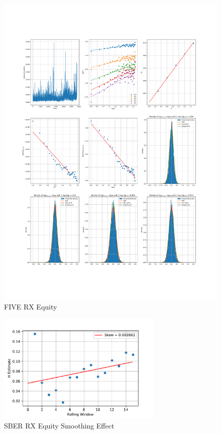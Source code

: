     \begin{figure}[h]
        \includegraphics[width=\textwidth]{fig/FIVE RX Equity.pdf}
        \caption{FIVE RX Equity}
    \end{figure}



    \begin{figure}[h]
        \centering
        \includegraphics[width=0.7\textwidth]{fig/SBER RX Equity Smoothing Effect.pdf}
        \caption{SBER RX Equity Smoothing Effect}
    \end{figure}

